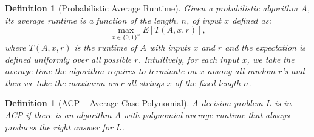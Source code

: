 \documentclass[a4paper,10pt]{article}
\newtheorem{definition}[theorem]{Definition}
\begin{document}
\begin{definition}[Probabilistic Average Runtime]
Given a probabilistic algorithm $A$, its average runtime is a function of the length, $n$, of input $x$ defined as:
$$\max_{x \in \{0, 1\}^n} E[T(A, x, r)],$$
where $T(A, x, r)$ is the runtime of $A$ with inputs $x$ and $r$ and the expectation is defined uniformly over all possible $r$. Intuitively, for each input $x$, we take the average time the algorithm requires to terminate on $x$ among all random $r$'s and then we take the maximum over all strings $x$ of the fixed length $n$.  
\end{definition}
\begin{definition}[ACP -- Average Case Polynomial]\label{acpdef}
A decision problem $L$ is in ACP if there is an algorithm $A$ with polynomial average runtime that always produces the right answer for $L$.
\end{definition}
\end{document}
